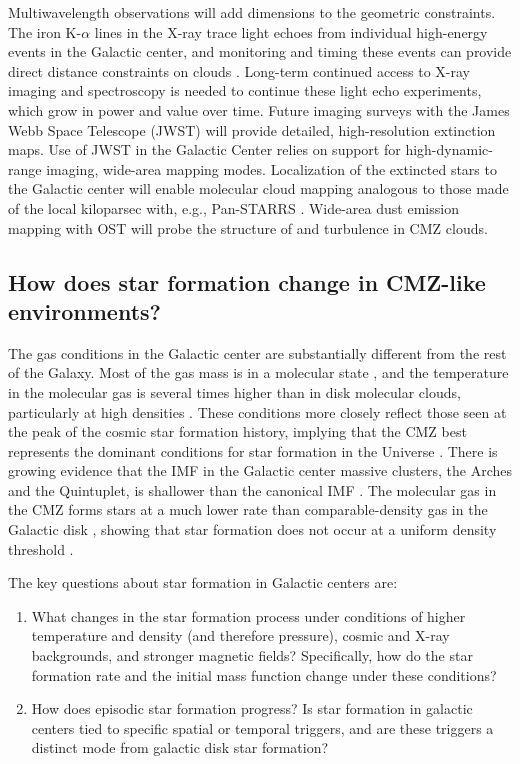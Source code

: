\documentclass[modern]{aastex62}
\begin{document}
Multiwavelength observations will add dimensions to the geometric constraints.
The iron K-$\alpha$ lines in the X-ray trace light echoes from individual
high-energy events in the Galactic center, and monitoring and timing these
events can provide direct distance constraints on clouds
\citep[e.g.][]{Clavel2014a,Churazov2017b,Churazov2017a,Terrier2018a}.
Long-term continued access to X-ray imaging and spectroscopy is needed to
continue these light echo experiments, which grow in power and value over time.
Future imaging surveys with the James Webb Space Telescope (JWST) will provide
detailed, high-resolution extinction maps.  Use of JWST in the Galactic Center
relies on support for high-dynamic-range imaging, wide-area mapping modes.
Localization of the extincted stars to the Galactic center will enable
molecular cloud mapping analogous to those made of the local kiloparsec with,
e.g., Pan-STARRS \citep{Green2015b}.  Wide-area dust emission mapping with OST
will probe the structure of and turbulence in CMZ clouds.



\subsection{How does star formation change in CMZ-like environments?}
The gas conditions in the Galactic center are substantially different from the
rest of the Galaxy.  Most of the gas mass is in a molecular state
\citep[e.g.,][]{Mills2017a}, and the temperature in the molecular gas is
several times higher than in disk molecular clouds, particularly at high
densities \citep{Ao2013a,Ginsburg2016a,Krieger2017a}. These conditions more
closely reflect those seen at the peak of the cosmic star formation history,
implying that the CMZ best represents the dominant conditions for star
formation in the Universe \citep{Kruijssen2013a}. There is growing evidence
that the IMF in the Galactic center massive clusters, the
Arches and the Quintuplet, is shallower than the canonical IMF
\citep{Hosek2018a}. The molecular gas in the CMZ forms stars at a much lower
rate than comparable-density gas in the Galactic disk \citep{Longmore2013b},
showing that star formation does not occur at a uniform density threshold
\citep{Rathborne2014b,Kruijssen2014c,Walker2017a,Barnes2017b,Ginsburg2018a}.

The key questions about star formation in Galactic centers are:
\begin{enumerate}
    \item What changes in the star formation process under conditions
        of higher temperature and density (and therefore pressure), 
        cosmic and X-ray backgrounds, and stronger magnetic fields?
        Specifically, how do the star formation rate and the initial
        mass function change under these conditions?
    \item How does episodic star formation progress?  Is star formation
        in galactic centers tied to specific spatial or temporal triggers,
        and are these triggers a distinct mode from galactic disk star
        formation?
\end{enumerate}
\end{document}

